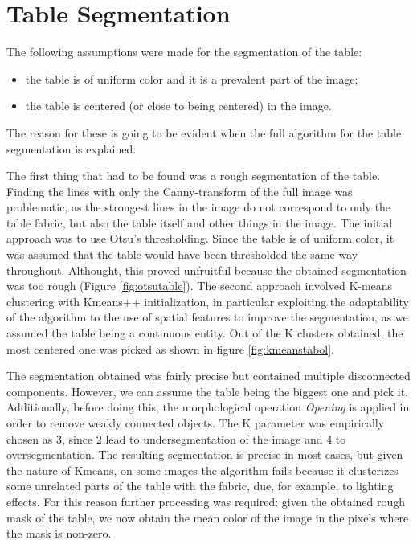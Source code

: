 \section{Table Segmentation}

The following assumptions were made for the segmentation of the table:
\begin{itemize}
    \item the table is of uniform color and it is a prevalent part of the image;
    \item the table is centered (or close to being centered) in the image.
\end{itemize}

\noindent
The reason for these is going to be evident when the full algorithm for
the table segmentation is explained. \par
The first thing that had to be found was a rough segmentation of the table.
Finding the lines with only the Canny-transform of the full image was 
problematic, as the strongest lines in the image do not correspond to only the table
fabric, but also the table itself and other things in the image.
The initial approach was to use Otsu's thresholding. Since the table is of uniform
color, it was assumed that the table would have been thresholded the same
way throughout. Althought, this proved unfruitful because the obtained segmentation was too rough (Figure \ref{fig:otsutable}).
The second approach involved K-means clustering with Kmeans++ initialization, in particular exploiting the
adaptability of the algorithm to the use of spatial features to improve
the segmentation, as we assumed the table being a continuous entity. Out of the K clusters obtained, the most centered one was picked as shown in figure \ref{fig:kmeanstabol}. \par
The segmentation obtained was fairly precise but contained multiple disconnected
components. However, we can assume the table being the biggest one and pick it. Additionally,
before doing this, the morphological operation \textit{Opening} is applied in order to remove weakly connected objects.
The K parameter was empirically chosen as 3, since 2 lead to undersegmentation of the image and 4 to oversegmentation.
The resulting segmentation is precise in most cases, but given the nature of Kmeans, on some
images the algorithm fails because it clusterizes some unrelated parts of the table with the fabric, due,
for example, to lighting effects.
For this reason further processing was required: given the obtained rough mask of
the table, we now obtain the mean color of the image in the pixels where the mask is non-zero.
